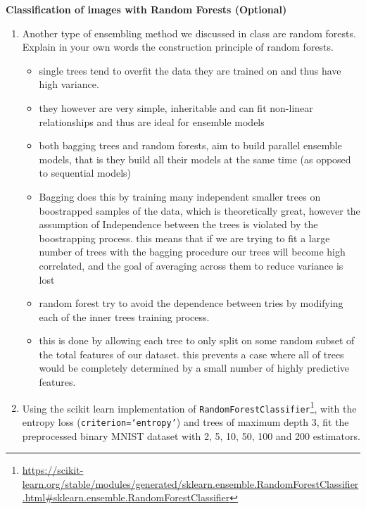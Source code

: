 \documentclass{article}
\newcommand{\nyuparagraph}[1]{\vspace{0.3cm}\textcolor{nyupurple}{\bf \large #1}\\}
\theoremstyle{plain}
\theoremstyle{definition}
\begin{document}
\nyuparagraph{Classification of images with Random Forests (Optional)}
\begin{enumerate}
  \setcounter{enumi}{\value{saveenum}}
\item Another type of ensembling method we discussed in class are random forests. Explain in your own words the construction principle of random forests.\\



\begin{itemize}
    \color{blue}
    \item single trees tend to overfit the data they are trained on and thus have high variance. 
    \item they however are very simple, inheritable and can fit non-linear relationships and thus are ideal for ensemble models 
    \item both bagging trees and random forests, aim to build parallel ensemble models, that is they build all their models at the same time (as opposed to sequential models) 
    \item Bagging does this by training many independent smaller trees on boostrapped samples of the data, which is theoretically great, however the assumption of Independence between the trees is violated by the boostrapping process. this means that if we are trying to fit a large number of trees with the bagging procedure our trees will become high correlated, and the goal of averaging across them to reduce variance is lost 
    \item random forest try to avoid the dependence between tries by modifying each of the inner trees training process. 
    \item this is done by allowing each tree to only split on some random subset of the total features of our dataset. this prevents a case where all of trees would be completely determined by a small number of highly predictive features. 
\end{itemize}


\item Using the scikit learn implementation of \texttt{RandomForestClassifier}\footnote{\url{https://scikit-learn.org/stable/modules/generated/sklearn.ensemble.RandomForestClassifier.html\#sklearn.ensemble.RandomForestClassifier}},
with the entropy loss (\texttt{criterion=`entropy'}) and trees of maximum depth 3, fit the preprocessed binary MNIST dataset with 2, 5, 10, 50, 100 and 200 estimators.\\


\end{enumerate}
\end{document}

